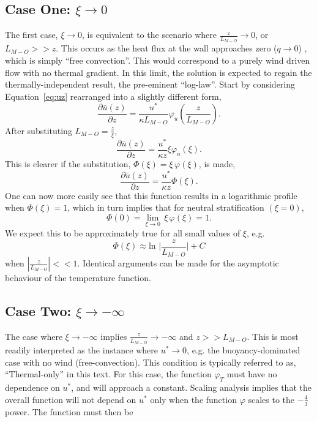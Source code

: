 \subsection*{Case One: $\xi \to 0$}
The first case, $\xi \to 0$, is equivalent to the scenario where
$\frac{z}{L_{M-O}} \to 0$, or $L_{M-O}>>z$. This occurs as the heat flux
at the wall approaches zero ($q \to 0$) , which is simply ``free
convection''. This would correspond to a purely wind driven flow with no
thermal gradient. In this limit, the solution is expected to regain the
thermally-independent result, the pre-eminent ``log-law''. Start by
considering Equation~\ref{eq:uz} rearranged into a slightly different form, 
\begin{equation}
 \frac{\partial \bar u(z)}{\partial z} = \frac{u^*}{\kappa L_{M-O}} \varphi_u(\frac{z}{L_{M-O}}).
\end{equation}
After substituting $L_{M-O}=\frac{z}{\xi}$, 
\begin{equation}
 \frac{\partial \bar u(z)}{\partial z} = \frac{u^*}{\kappa z} \xi \varphi_u(\xi).
\end{equation}
This is clearer if the substitution, $\Phi(\xi) = \xi \, \varphi(\xi)$, is made,
\begin{equation}
 \frac{\partial \bar u(z)}{\partial z} = \frac{u^*}{\kappa z} \Phi(\xi).
\end{equation}
One can now more easily see that this function results in a logarithmic
profile when $\Phi(\xi) = 1$, which in turn implies that for neutral
stratification $(\xi = 0)$, 
\begin{equation}
 \Phi(0) = \lim_{\xi \to 0} \, \xi \, \varphi(\xi)= 1. 
\end{equation}
We expect this to be approximately true for all small values of
$\xi$, e.g. 
\begin{equation}
 \Phi(\xi) \approx \text{ln } \rvert \frac{z}{L_{M-O}} \rvert + C 
\end{equation}
 when $ |\frac{z}{L_{M-O}}| << 1$. Identical arguments can be made for the
 asymptotic behaviour of the temperature function.

\subsection*{Case Two: $\xi \to -\infty$}

The case where $\xi \to -\infty $ implies $\frac{z}{L_{M-O}} \to
-\infty $ and $z>>L_{M-O}$. This is most readily interpreted as the instance
where $u^* \to 0$, e.g. the buoyancy-dominated case with no wind
(free-convection). This condition is typically referred to as,
``Thermal-only'' in this text. 
For this case, the function $\varphi_T$ must have no
dependence on $u^*$, and will approach a constant. Scaling
analysis implies that the overall function will not depend on $u^*$ only
when the function $\varphi$ scales to the $-\frac{4}{3}$ power. The
function must then be

